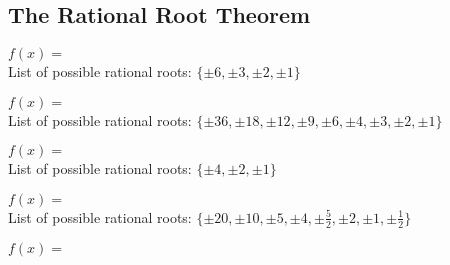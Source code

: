 \documentclass[12pt]{book}
\theoremstyle{definition}
\newcommand{\Desmos}{\href{https://www.desmos.com/}{Desmos}}
\begin{document}
\subsection*{The Rational Root Theorem}
\begin{oddenumerate}
	\item $f(x) = $ \\
	List of possible rational roots: $\{\pm 6, \pm 3, \pm 2, \pm 1\}$
	\item $f(x) = $ \\
	List of possible rational roots: $\{\pm 36, \pm 18, \pm 12, \pm 9, \pm 6, \pm 4, \pm 3, \pm 2, \pm 1\}$
	\item $f(x) = $ \\
	List of possible rational roots: $\{\pm 4, \pm 2, \pm 1 \}$
	\item $f(x) = $ \\
	List of possible rational roots: $\{\pm 20, \pm 10, \pm 5, \pm 4, \pm{\frac{5}{2}}, \pm 2, \pm 1, \pm{\frac{1}{2}}\}$
	\item $f(x) = $ \\

\end{oddenumerate}
\end{document}
